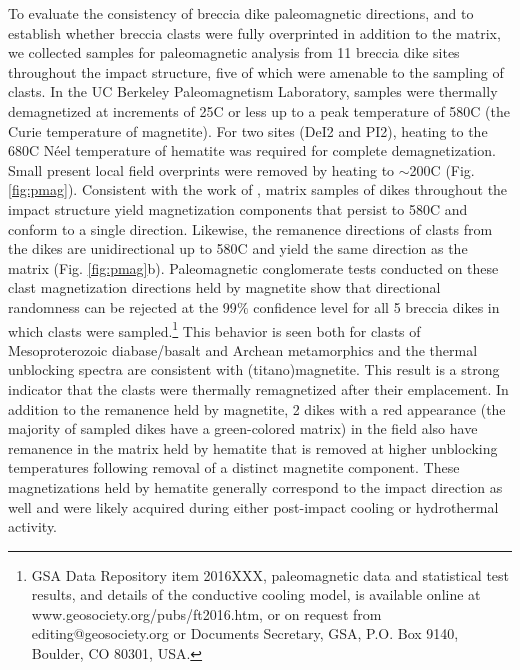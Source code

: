 \documentclass[11pt,letterpaper]{article}
\begin{document}
To evaluate the consistency of breccia dike paleomagnetic directions, and to establish whether breccia clasts were fully overprinted in addition to the matrix, we collected samples for paleomagnetic analysis from 11 breccia dike sites throughout the impact structure, five of which were amenable to the sampling of clasts. In the UC Berkeley Paleomagnetism Laboratory, samples were thermally demagnetized at increments of 25\textdegree C or less up to a peak temperature of 580\textdegree C (the Curie temperature of magnetite). For two sites (DeI2 and PI2), heating to the 680\textdegree C N\'eel temperature of hematite was required for complete demagnetization. Small present local field overprints were removed by heating to $\sim$200\textdegree C (Fig. \ref{fig:pmag}). Consistent with the work of \cite{Halls1979a}, matrix samples of dikes throughout the impact structure yield magnetization components that persist to 580\textdegree C and conform to a single direction. Likewise, the remanence directions of clasts from the dikes are unidirectional up to 580\textdegree C and yield the same direction as the matrix (Fig. \ref{fig:pmag}b). Paleomagnetic conglomerate tests \citep{Watson1956a} conducted on these clast magnetization directions held by magnetite show that directional randomness can be rejected at the 99$\%$ confidence level for all 5 breccia dikes in which clasts were sampled.\footnote{GSA Data Repository item 2016XXX, paleomagnetic data and statistical test results, and details of the conductive cooling model, is available online at www.geosociety.org/pubs/ft2016.htm, or on request from editing@geosociety.org or Documents Secretary, GSA, P.O. Box 9140, Boulder, CO 80301, USA.} This behavior is seen both for clasts of Mesoproterozoic diabase/basalt and Archean metamorphics and the thermal unblocking spectra are consistent with (titano)magnetite. This result is a strong indicator that the clasts were thermally remagnetized after their emplacement. In addition to the remanence held by magnetite, 2 dikes with a red appearance (the majority of sampled dikes have a green-colored matrix) in the field also have remanence in the matrix held by hematite that is removed at higher unblocking temperatures following removal of a distinct magnetite component. These magnetizations held by hematite generally correspond to the impact direction as well and were likely acquired during either post-impact cooling or hydrothermal activity.
\end{document}
